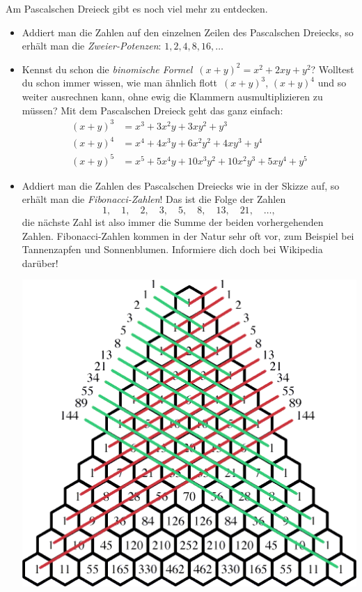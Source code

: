 \documentclass[a4paper,ngerman]{scrartcl}
\begin{document}

\newpage

Am Pascalschen Dreieck gibt es noch viel mehr zu entdecken.

\begin{itemize}
\item Addiert man die Zahlen auf den einzelnen Zeilen des Pascalschen Dreiecks,
so erhält man die \emph{Zweier-Potenzen}: $1, 2, 4, 8, 16, \ldots$

\item Kennst du schon die \emph{binomische Formel}~$(x+y)^2 = x^2 + 2xy + y^2$?
Wolltest du schon immer wissen, wie man ähnlich flott~$(x+y)^3$, $(x+y)^4$ und
so weiter ausrechnen kann, ohne ewig die Klammern ausmultiplizieren zu müssen?
Mit dem Pascalschen Dreieck geht das ganz einfach:
\begin{align*}
  (x+y)^3 &= x^3 + 3x^2y + 3xy^2 + y^3 \\
  (x+y)^4 &= x^4 + 4x^3y + 6x^2y^2 + 4xy^3 + y^4 \\
  (x+y)^5 &= x^5 + 5x^4y + 10x^3y^2 + 10x^2y^3 + 5xy^4 + y^5
\end{align*}

\item Addiert man die Zahlen des Pascalschen Dreiecks wie in der Skizze auf, so
erhält man die \emph{Fibonacci-Zahlen}! Das ist die Folge der Zahlen
\[ 1, \quad 1, \quad 2, \quad 3, \quad 5, \quad 8, \quad 13, \quad 21, \quad
\ldots, \]
die nächste Zahl ist also immer die Summe der beiden vorhergehenden Zahlen.
Fibonacci-Zahlen kommen in der Natur sehr oft vor, zum Beispiel bei
Tannenzapfen und Sonnenblumen. Informiere dich doch bei Wikipedia darüber!

\begin{center}
\includegraphics[scale=0.9]{pascal-fibonacci}
\end{center}
\end{itemize}
\end{document}
